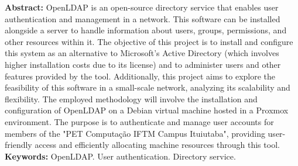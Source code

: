 \begin{singlespace}
\textbf{Abstract: }
OpenLDAP is an open-source directory service that enables user authentication and management in a network. This software can be installed alongside a server to handle information about users, groups, permissions, and other resources within it. The objective of this project is to install and configure this system as an alternative to Microsoft's Active Directory (which involves higher installation costs due to its license) and to administer users and other features provided by the tool. Additionally, this project aims to explore the feasibility of this software in a small-scale network, analyzing its scalability and flexibility. The employed methodology will involve the installation and configuration of OpenLDAP on a Debian virtual machine hosted in a Proxmox environment. The purpose is to authenticate and manage user accounts for members of the "PET Computação IFTM Campus Ituiutaba", providing user-friendly access and efficiently allocating machine resources through this tool.\\
\textbf{Keywords: }
OpenLDAP. User authentication. Directory service.
\end{singlespace}
